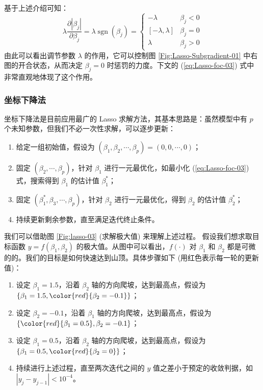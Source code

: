 基于上述介绍可知：
$$
\lambda \frac{\partial\left|\beta_{j}\right|}{\partial{\beta_{j}}}
= \lambda \operatorname{sgn}\left(\beta_{j}\right)
=  
\begin{cases}-\lambda & \beta_{j}<0 \\ {[-\lambda, \lambda]} & \beta_{j}=0 \\ \lambda & \beta_{j}>0\end{cases}
$$
由此可以看出调节参数 $\lambda$ 的作用，它可以控制图 \ref{Fig:Lasso-Subgradient-01} 中右图的开合状态，从而决定 $\beta_j=0$ 时惩罚的力度。下文的 (\ref{eq:Lasso-foc-03}) 式中非常直观地体现了这个作用。

\subsubsection{坐标下降法}
坐标下降法是目前应用最广的 Lasso 求解方法，其基本思路是：虽然模型中有 $p$ 个未知参数，但我们不必一次性求解，可以逐步更新：
\begin{enumerate}
\item 给定一组初始值，假设为 $(\beta_1,\beta_2,\cdots,\beta_p) = (0,0,\cdots,0)$；
\item 固定 $(\beta_2,\cdots,\beta_p)$，针对 $\beta_1$ 进行一元最优化，如最小化 (\ref{eq:Lasso-foc-03}) 式，搜索得到 $\beta_1$ 的估计值 $\beta_1^*$；
\item 固定 $(\beta_1^*,\beta_3,\cdots,\beta_p)$，针对 $\beta_2$ 进行一元最优化，得到 $\beta_2$ 的估计值 $\beta_2^*$；
\item 持续更新剩余参数，直至满足迭代终止条件。
\end{enumerate}
 
我们可以借助图 \ref{Fig:lasso-03} (求解极大值) 来理解上述过程。
假设我们想求取目标函数 $y=f(\beta_1, \beta_2)$ 的极大值。从图中可以看出，$f(\cdot)$ 对 $\beta_1$ 和 $\beta_2$ 都是可微的的。我们的目标是如何快速达到山顶。具体步骤如下 (用红色表示每一轮的更新值)：
\begin{enumerate}
\renewcommand{\labelenumi}{(\theenumi)} %
\item 设定 $\beta_1 = 1.5$，沿着 $\beta_2$ 轴的方向爬坡，达到最高点，假设为 $\{\beta_1=1.5, {\color{red}{\beta_2=-0.1}}\}$；
\item 设定 $\beta_2 = -0.1$，沿着 $\beta_1$ 轴的方向爬坡，达到最高点，假设为 $\{{\color{red}{\beta_1=0.5}}, \beta_2=-0.1\}$；
\item 设定 $\beta_1=0.5$，沿着 $\beta_2$ 轴的方向爬坡，达到最高点，假设为 $\{\beta_1=0.5, {\color{red}{\beta_2=0}}\}$；
\item 持续进行上述过程，直至两次迭代之间的 $y$ 值之差小于预定的收敛判据，如 $|y_j - y_{j-1}|<10^{-4}$。
\end{enumerate}
 


